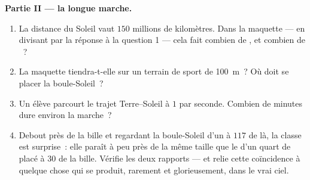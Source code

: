 \begin{problem}
\medskip\noindent\textbf{Partie II --- la longue marche.}
\begin{enumerate}[resume]
  \item La distance du Soleil vaut $150$ millions de kilomètres.
        Dans la maquette --- en divisant par la réponse à la
        question 1 --- cela fait combien de , et combien
        de ~?
  \item La maquette tiendra-t-elle sur un terrain de sport de
        \qty{100}{m}~? Où doit se placer la boule-Soleil~?
  \item Un élève parcourt le trajet Terre--Soleil à $1$  par
        seconde. Combien de minutes dure environ la marche~?
  \item Debout près de la bille et regardant la boule-Soleil d'un
         à $117$  de là, la classe est surprise~: elle
        paraît à peu près de la même taille que le  d'un
        quart de  placé à $30$  de la bille.
        Vérifie les deux rapports --- et relie cette coïncidence à
        quelque chose qui se produit, rarement et glorieusement,
        dans le vrai ciel.
\end{enumerate}


\end{problem}
